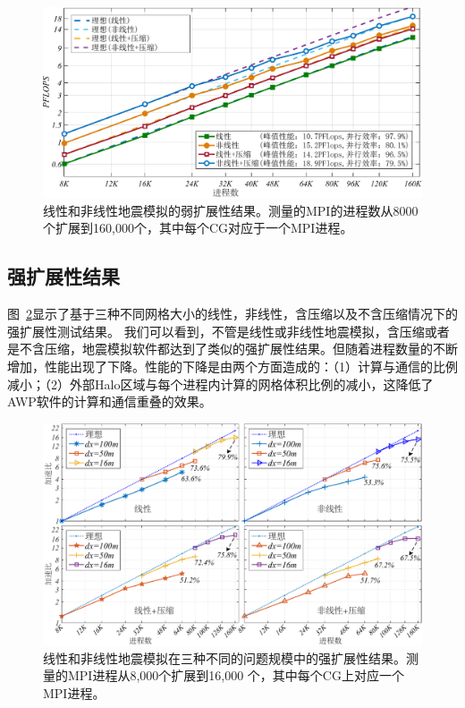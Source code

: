 \documentclass[degree=doctor]{thuthesis}
\begin{document}
\begin{figure}[h]
\centering
\includegraphics[width=0.9\columnwidth]{weak_scaling.pdf}
\caption{线性和非线性地震模拟的弱扩展性结果。测量的MPI的进程数从8000个扩展到160,000个，其中每个CG对应于一个MPI进程。}
\label{fig:weak-scaling}
\end{figure}

\subsection{强扩展性结果}

图~\ref {fig:strong-scaling}显示了基于三种不同网格大小的线性，非线性，含压缩以及不含压缩情况下的强扩展性测试结果。 我们可以看到，不管是线性或非线性地震模拟，含压缩或者是不含压缩，地震模拟软件都达到了类似的强扩展性结果。但随着进程数量的不断增加，性能出现了下降。性能的下降是由两个方面造成的：（1）计算与通信的比例减小；（2）外部Halo区域与每个进程内计算的网格体积比例的减小，这降低了AWP软件的计算和通信重叠的效果。


\begin{figure}[h]
\centering
\includegraphics[width=1.0\columnwidth]{strong_scaling.pdf}
\caption{线性和非线性地震模拟在三种不同的问题规模中的强扩展性结果。测量的MPI进程从8,000个扩展到16,000 个，其中每个CG上对应一个MPI进程。}
\label{fig:strong-scaling}
\end{figure}
\end{document}
